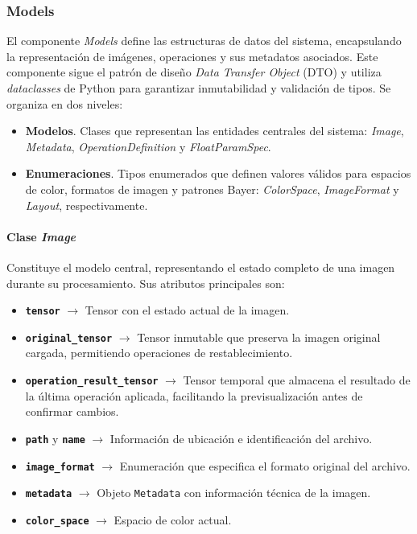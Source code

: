 \subsubsection{Models} \label{subsubsec:7_3_1_models}
El componente \textit{Models} define las estructuras de datos del sistema, encapsulando 
la representación de imágenes, operaciones y sus metadatos asociados. Este componente sigue el 
patrón de diseño \textit{Data Transfer Object} (DTO) y utiliza \textit{dataclasses} 
\cite{python_dataclasses} de Python para garantizar inmutabilidad y validación de tipos.
Se organiza en dos niveles:

\begin{itemize}[noitemsep]
    \item \textbf{Modelos}. Clases que representan las entidades centrales del sistema: 
    \textit{Image}, \textit{Metadata}, \textit{OperationDefinition} y \textit{FloatParamSpec}.
    \item \textbf{Enumeraciones}. Tipos enumerados que definen valores válidos para espacios de 
    color, formatos de imagen y patrones Bayer: \textit{ColorSpace}, \textit{ImageFormat} y \textit{Layout},
    respectivamente.
\end{itemize}


\paragraph{Clase \textit{Image}} \label{par:7_3_1_1_image}
Constituye el modelo central, representando el estado completo de una imagen durante su procesamiento.
Sus atributos principales son:

\begin{itemize}[noitemsep]
    \item \texttt{\textbf{tensor}} $\rightarrow$ Tensor con el estado actual de la imagen.
    \item \texttt{\textbf{original\_tensor}} $\rightarrow$ Tensor inmutable que preserva la imagen original 
    cargada, permitiendo operaciones de restablecimiento.
    \item \texttt{\textbf{operation\_result\_tensor}} $\rightarrow$ Tensor temporal que almacena el resultado 
    de la última operación aplicada, facilitando la previsualización antes de confirmar cambios.
    \item \texttt{\textbf{path}} y \texttt{\textbf{name}} $\rightarrow$ Información de ubicación e identificación del archivo.
    \item \texttt{\textbf{image\_format}} $\rightarrow$ Enumeración que especifica el formato original del archivo.
    \item \texttt{\textbf{metadata}} $\rightarrow$ Objeto \texttt{Metadata} con información técnica de la imagen.
    \item \texttt{\textbf{color\_space}} $\rightarrow$ Espacio de color actual.
\end{itemize}

